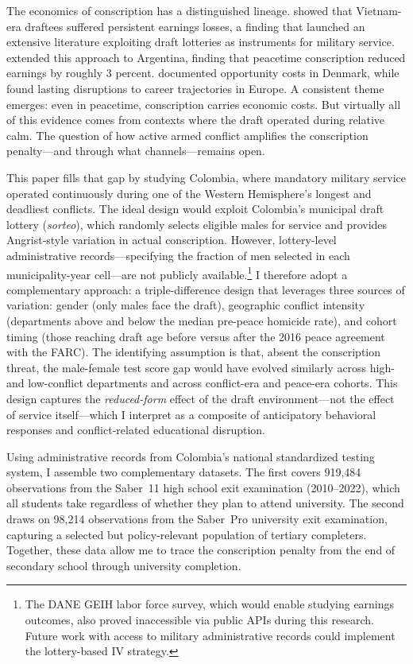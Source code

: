 \documentclass[12pt]{article}
\begin{document}
The economics of conscription has a distinguished lineage. \citet{angrist1990} showed that Vietnam-era draftees suffered persistent earnings losses, a finding that launched an extensive literature exploiting draft lotteries as instruments for military service. \citet{angrist2011} extended this approach to Argentina, finding that peacetime conscription reduced earnings by roughly 3 percent. \citet{bingley2020} documented opportunity costs in Denmark, while \citet{ichino2004} found lasting disruptions to career trajectories in Europe. A consistent theme emerges: even in peacetime, conscription carries economic costs. But virtually all of this evidence comes from contexts where the draft operated during relative calm. The question of how active armed conflict amplifies the conscription penalty---and through what channels---remains open.

This paper fills that gap by studying Colombia, where mandatory military service operated continuously during one of the Western Hemisphere's longest and deadliest conflicts. The ideal design would exploit Colombia's municipal draft lottery (\textit{sorteo}), which randomly selects eligible males for service and provides Angrist-style variation in actual conscription. However, lottery-level administrative records---specifying the fraction of men selected in each municipality-year cell---are not publicly available.\footnote{The DANE GEIH labor force survey, which would enable studying earnings outcomes, also proved inaccessible via public APIs during this research. Future work with access to military administrative records could implement the lottery-based IV strategy.} I therefore adopt a complementary approach: a triple-difference design that leverages three sources of variation: gender (only males face the draft), geographic conflict intensity (departments above and below the median pre-peace homicide rate), and cohort timing (those reaching draft age before versus after the 2016 peace agreement with the FARC). The identifying assumption is that, absent the conscription threat, the male-female test score gap would have evolved similarly across high- and low-conflict departments and across conflict-era and peace-era cohorts. This design captures the \textit{reduced-form} effect of the draft environment---not the effect of service itself---which I interpret as a composite of anticipatory behavioral responses and conflict-related educational disruption.

Using administrative records from Colombia's national standardized testing system, I assemble two complementary datasets. The first covers 919,484 observations from the Saber~11 high school exit examination (2010--2022), which all students take regardless of whether they plan to attend university. The second draws on 98,214 observations from the Saber~Pro university exit examination, capturing a selected but policy-relevant population of tertiary completers. Together, these data allow me to trace the conscription penalty from the end of secondary school through university completion.
\end{document}
